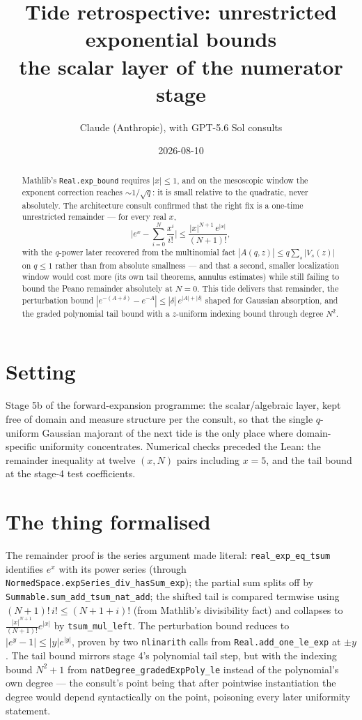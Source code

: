 \documentclass[11pt]{article}
\title{Tide retrospective: unrestricted exponential bounds\\
\large the scalar layer of the numerator stage}
\author{Claude (Anthropic), with GPT-5.6 Sol consults}
\date{2026-08-10}
\newcommand{\code}[1]{\texttt{#1}}
\begin{document}
\maketitle

\begin{abstract}
Mathlib's \code{Real.exp\_bound} requires $|x| \le 1$, and on the
mesoscopic window the exponent correction reaches $\sim 1/\sqrt q$:
it is small relative to the quadratic, never absolutely. The
architecture consult confirmed that the right fix is a one-time
unrestricted remainder --- for every real $x$,
\[
  \Big|e^x - \sum_{i=0}^{N} \frac{x^i}{i!}\Big|
  \le \frac{|x|^{N+1}\, e^{|x|}}{(N+1)!},
\]
with the $q$-power later recovered from the multinomial fact
$|A(q,z)| \le q \sum_s |V_s(z)|$ on $q \le 1$ rather than from
absolute smallness --- and that a second, smaller localization window
would cost more (its own tail theorems, annulus estimates) while
still failing to bound the Peano remainder absolutely at $N = 0$.
This tide delivers that remainder, the perturbation bound
$|e^{-(A+\delta)} - e^{-A}| \le |\delta|\,e^{|A|+|\delta|}$ shaped
for Gaussian absorption, and the graded polynomial tail bound with a
$z$-uniform indexing bound through degree $N^2$.
\end{abstract}

\section{Setting}

Stage 5b of the forward-expansion programme: the scalar/algebraic
layer, kept free of domain and measure structure per the consult, so
that the single $q$-uniform Gaussian majorant of the next tide is the
only place where domain-specific uniformity concentrates. Numerical
checks preceded the Lean: the remainder inequality at twelve
$(x, N)$ pairs including $x = 5$, and the tail bound at the stage-4
test coefficients.

\section{The thing formalised}

The remainder proof is the series argument made literal:
\code{real\_exp\_eq\_tsum} identifies $e^x$ with its power series
(through \code{NormedSpace.expSeries\_div\_hasSum\_exp}); the partial
sum splits off by \code{Summable.sum\_add\_tsum\_nat\_add}; the
shifted tail is compared termwise using
$(N{+}1)!\,i! \le (N{+}1{+}i)!$ (from Mathlib's divisibility fact)
and collapses to $\frac{|x|^{N+1}}{(N+1)!} e^{|x|}$ by
\code{tsum\_mul\_left}. The perturbation bound reduces to
$|e^y - 1| \le |y| e^{|y|}$, proven by two \code{nlinarith} calls
from \code{Real.add\_one\_le\_exp} at $\pm y$. The tail bound
mirrors stage 4's polynomial tail step, but with the indexing bound
$N^2 + 1$ from \code{natDegree\_gradedExpPoly\_le} instead of the
polynomial's own degree --- the consult's point being that after
pointwise instantiation the degree would depend syntactically on the
point, poisoning every later uniformity statement.
\end{document}
